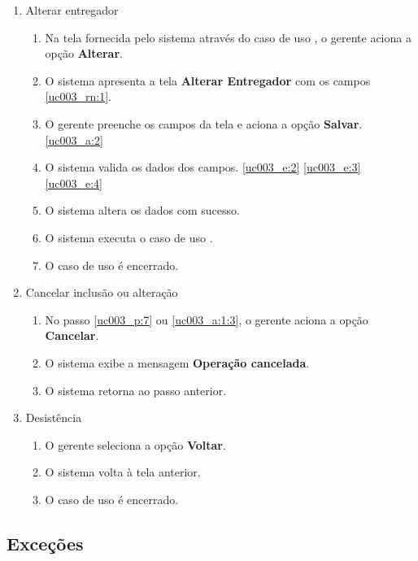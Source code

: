 \begin{enumerate}[label=A\arabic*]
	\item Alterar entregador \label{uc003_a:1}
	\begin{enumerate}[label*=.\arabic*]
		\item Na tela fornecida pelo sistema através do caso de uso , o gerente aciona a opção \textbf{Alterar}. 
		\item O sistema apresenta a tela \textbf{Alterar Entregador} com os campos \ref{uc003_rn:1}. \label{uc003_a:1:2}
		\item O gerente preenche os campos da tela e aciona a opção \textbf{Salvar}. \label{uc003_a:1:3} \ref{uc003_a:2}
		\item O sistema valida os dados dos campos. \ref{uc003_e:2} \ref{uc003_e:3} \ref{uc003_e:4}
		\item O sistema altera os dados com sucesso.
		\item O sistema executa o caso de uso .
		\item O caso de uso é encerrado.
	\end{enumerate}
	
	\item Cancelar inclusão ou alteração \label{uc003_a:2}
	\begin{enumerate}[label*=.\arabic*]
		\item No passo \ref{uc003_p:7} ou \ref{uc003_a:1:3}, o gerente aciona a opção \textbf{Cancelar}.
		\item O sistema exibe a mensagem \textbf{Operação cancelada}.
		\item O sistema retorna ao passo anterior.
	\end{enumerate}
	
	\item Desistência
	\begin{enumerate}[label*=.\arabic*]
		\item O gerente seleciona a opção \textbf{Voltar}.
		\item O sistema volta à tela anterior.
		\item O caso de uso é encerrado.		
	\end{enumerate}		 	
\end{enumerate}

\subsection{Exceções}

